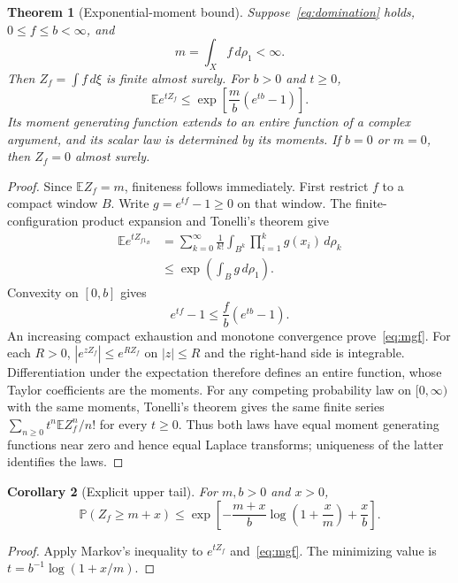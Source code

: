 \documentclass[11pt,a4paper]{article}
\newtheorem{theorem}{Theorem}[section]
\newtheorem{corollary}[theorem]{Corollary}
\theoremstyle{remark}\newtheorem{remark}[theorem]{Remark}
\newcommand{\E}{\mathbb E}
\newcommand{\Prb}{\mathbb P}
\begin{document}
\begin{theorem}[Exponential-moment bound]\label{thm:mgf}
Suppose~\eqref{eq:domination} holds, $0\le f\le b<\infty$, and
\begin{equation}
 m=\int_X f\,d\rho_1<\infty.
\end{equation}
Then $Z_f=\int f\,d\xi$ is finite almost surely.
For $b>0$ and $t\ge0$,
\begin{equation}\label{eq:mgf}
 \E e^{tZ_f}\le
 \exp\left[\frac mb(e^{tb}-1)\right].
\end{equation}
Its moment generating function extends to an entire function of a complex argument, and its scalar law is determined by its moments.
If $b=0$ or $m=0$, then $Z_f=0$ almost surely.
\end{theorem}
\begin{proof}
Since $\E Z_f=m$, finiteness follows immediately.
First restrict $f$ to a compact window $B$.
Write $g=e^{tf}-1\ge0$ on that window.
The finite-configuration product expansion and Tonelli's theorem give
\begin{align}
 \E e^{tZ_{f1_B}}
 &=\sum_{k=0}^{\infty}\frac1{k!}\int_{B^k}\prod_{i=1}^k g(x_i)\,d\rho_k\\
 &\le\exp\left(\int_Bg\,d\rho_1\right).
\end{align}
Convexity on $[0,b]$ gives
\begin{equation}
 e^{tf}-1\le\frac f b(e^{tb}-1).
\end{equation}
An increasing compact exhaustion and monotone convergence prove~\eqref{eq:mgf}.
For each $R>0$, $|e^{zZ_f}|\le e^{RZ_f}$ on $|z|\le R$ and the right-hand side is integrable.
Differentiation under the expectation therefore defines an entire function, whose Taylor coefficients are the moments.
For any competing probability law on $[0,\infty)$ with the same moments, Tonelli's theorem gives the same finite series $\sum_{n\ge0}t^n\E Z_f^n/n!$ for every $t\ge0$.
Thus both laws have equal moment generating functions near zero and hence equal Laplace transforms; uniqueness of the latter identifies the laws.
\end{proof}

\begin{corollary}[Explicit upper tail]\label{cor:tail}
For $m,b>0$ and $x>0$,
\begin{equation}\label{eq:tail}
 \Prb(Z_f\ge m+x)
 \le\exp\left[-\frac{m+x}{b}\log\left(1+\frac xm\right)+\frac xb\right].
\end{equation}
\end{corollary}
\begin{proof}
Apply Markov's inequality to $e^{tZ_f}$ and~\eqref{eq:mgf}.
The minimizing value is $t=b^{-1}\log(1+x/m)$.
\end{proof}
\end{document}
